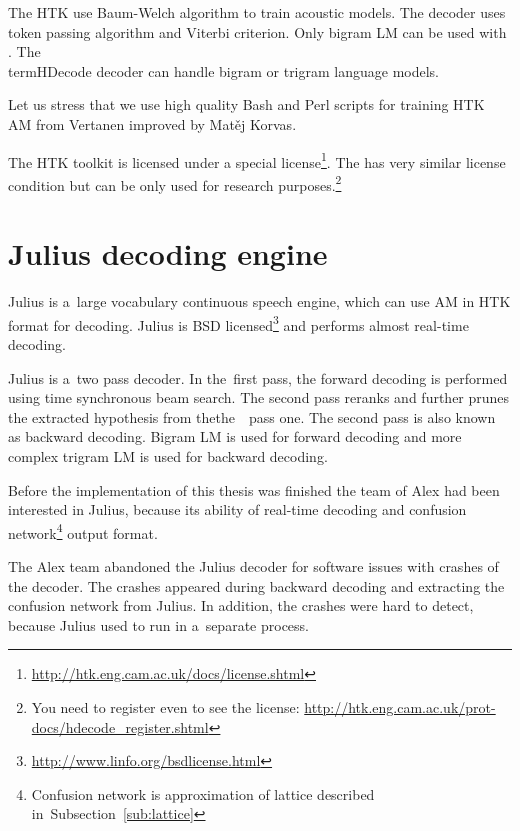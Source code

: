 {The \ac{HTK} use Baum-Welch algorithm to train acoustic models.
The  decoder uses token passing algorithm and Viterbi criterion.
\cite{HTKBook3.4} %
Only bigram \ac{LM} can be used with .
The \\term{HDecode} decoder can handle bigram or trigram language models. 


Let us stress that we use high quality Bash and Perl scripts for training \ac{HTK} \ac{AM} from Vertanen improved by Matěj Korvas.\cite{vertanen_baseline_2006}\cite{korvas_2014}

The \ac{HTK} toolkit is licensed under a special license\footnote{\url{http://htk.eng.cam.ac.uk/docs/license.shtml}}.
The  has very similar license condition but can be only used for research purposes.\footnote{You need to register even to see the license: \url{http://htk.eng.cam.ac.uk/prot-docs/hdecode_register.shtml}}

\section{Julius decoding engine}
\label{sec:back_julius}

Julius is a~large vocabulary continuous speech engine, which can use \ac{AM} in \ac{HTK} format for decoding.\cite{lee2009julius}
Julius is BSD licensed\footnote{\url{http://www.linfo.org/bsdlicense.html}} and performs almost real-time decoding.

Julius is a~two pass decoder. 
In the~first pass, the forward decoding is performed using time synchronous beam search.
The second pass reranks and further prunes the extracted hypothesis from thethe~~pass one.
The second pass is also known as backward decoding.
Bigram \ac{LM} is used for forward decoding and more complex trigram \ac{LM} is used for backward decoding.

Before the implementation of this thesis was finished the team of Alex had been interested in Julius, because its ability of real-time decoding and confusion network\footnote{Confusion network is approximation of lattice described in~Subsection~\ref{sub:lattice}} output format.

The Alex team abandoned the Julius decoder for software issues with crashes of the decoder. 
The crashes appeared during backward decoding and extracting the confusion network from Julius. 
In addition, the crashes were hard to detect, because Julius used to run in a~separate process.

}
